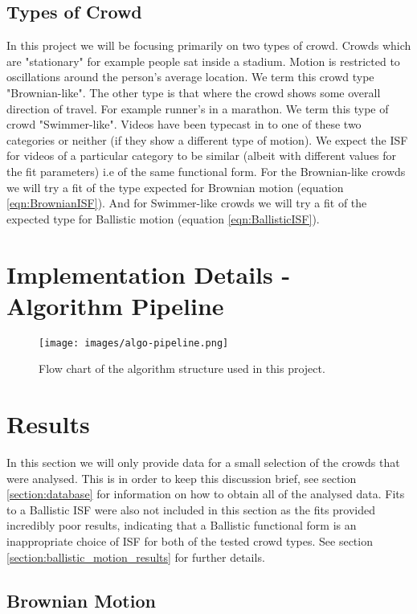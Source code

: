\documentclass[10pt]{article}
\begin{document}
\subsection{Types of Crowd}
\label{section:crowdtypes}
In this project we will be focusing primarily on two types of crowd. Crowds which are "stationary" for example people sat inside a stadium. Motion is restricted to oscillations around the person's average location. We term this crowd type "Brownian-like". The other type is that where the crowd shows some overall direction of travel. For example runner's in a marathon. We term this type of crowd "Swimmer-like". Videos have been typecast in to one of these two categories or neither (if they show a different type of motion). We expect the ISF for videos of a particular category to be similar (albeit with different values for the fit parameters) i.e of the same functional form. For the Brownian-like crowds we will try a fit of the type expected for Brownian motion (equation \ref{eqn:BrownianISF}). And for Swimmer-like crowds we will try a fit of the expected type for Ballistic motion (equation \ref{eqn:BallisticISF}).

\clearpage
\section{Implementation Details - Algorithm Pipeline}
\begin{figure}[H]
\centering
\texttt{[image: images/algo-pipeline.png]}
\caption{Flow chart of the algorithm structure used in this project.}
\end{figure}

\section{Results}
\label{section:results}
In this section we will only provide data for a small selection of the crowds that were analysed. This is in order to keep this discussion brief, see section \ref{section:database} for information on how to obtain all of the analysed data. Fits to a Ballistic ISF were also not included in this section as the fits provided incredibly poor results, indicating that a Ballistic functional form is an inappropriate choice of ISF for both of the tested crowd types. See section \ref{section:ballistic_motion_results} for further details.

\subsection{Brownian Motion}
\label{section:brownian}
\end{document}

